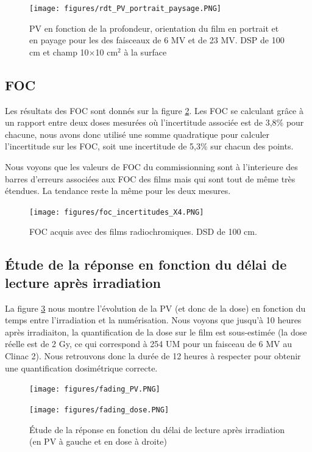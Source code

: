 \documentclass{book}
\begin{document}
\newpage
\begin{figure}[h]
  \centering
  \texttt{[image: figures/rdt\_PV\_portrait\_paysage.PNG]}
  \caption{PV en fonction de la profondeur, orientation du film en portrait et en payage pour les des faisceaux de 6 MV et de 23 MV. DSP de 100 cm et champ 10$\times$10 cm$^2$ à la surface}
  \label{fig_fading_PV}
\end{figure}

\subsection{FOC}

Les résultats des FOC sont donnés sur la figure \ref*{fig_foc_films}. Les FOC se calculant grâce à un rapport entre deux doses mesurées où l'incertitude associée est de 3,8\% pour chacune, nous avons donc utilisé une somme quadratique pour calculer l'incertitude sur les FOC, soit une incertitude de 5,3\% sur chacun des points.

Nous voyons que les valeurs de FOC du commissionning sont à l'interieure des barres d'erreurs associées aux FOC des films mais qui sont tout de même très étendues. La tendance reste la même pour les deux mesures.

\begin{figure}[h]
  \centering
  \texttt{[image: figures/foc\_incertitudes\_X4.PNG]}
  \caption{FOC acquis avec des films radiochromiques. DSD de 100 cm.}
  \label{fig_foc_films}
\end{figure}

\subsection{Étude de la réponse en fonction du délai de lecture après irradiation}

La figure \ref*{fig_fading} nous montre l'évolution de la PV (et donc de la dose) en fonction du temps entre l'irradiation et la numérisation. Nous voyons que jusqu'à 10 heures après irradiaiton, la quantification de la dose sur le film est sous-estimée (la dose réelle est de 2 Gy, ce qui correspond à 254 UM pour un faisceau de 6 MV au Clinac 2). Nous retrouvons donc la durée de 12 heures à respecter pour obtenir une quantification dosimétrique correcte. 

\begin{figure}[h]
  \centering
  \begin{minipage}{.47\linewidth}
    \texttt{[image: figures/fading\_PV.PNG]}
  \end{minipage}
  \begin{minipage}{.47\linewidth}
    \texttt{[image: figures/fading\_dose.PNG]}
  \end{minipage}
  \caption{Étude de la réponse en fonction du délai de lecture après irradiation (en PV à gauche et en dose à droite)}
  \label{fig_fading}
\end{figure}
\end{document}

